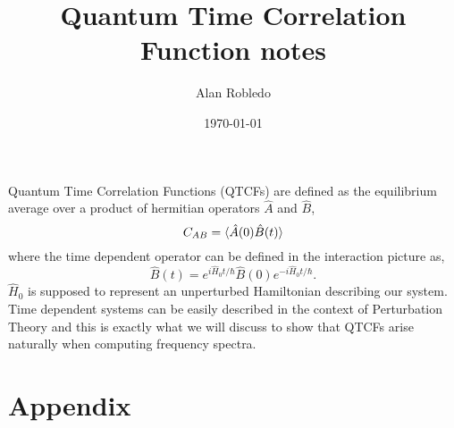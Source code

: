 \documentclass{article}
\title{Quantum Time Correlation Function notes}
\date{\today}
\author{Alan Robledo}
\newcommand{\be}{\begin{equation*}}
\newcommand{\ee}{\end{equation*}}
\begin{document}
\maketitle
Quantum Time Correlation Functions (QTCFs) are defined as the equilibrium average over a product of hermitian operators $\hat{A}$ and $\hat{B}$,
\be
  C_{AB} = \braket{\hat{A}(0) \hat{B}(t)}
\ee
where the time dependent operator can be defined in the interaction picture as,
\be
  \hat{B}(t) = e^{i \hat{H}_0 t/ \hbar} \hat{B}(0) e^{-i \hat{H}_0 t/ \hbar} .
\ee
$\hat{H}_0$ is supposed to represent an unperturbed Hamiltonian describing our system. Time dependent systems can be easily described in the context of Perturbation Theory and this is exactly what we will discuss to show that QTCFs arise naturally when computing frequency spectra.


\section{Appendix}
\end{document}
